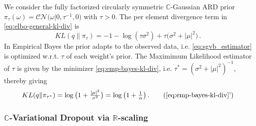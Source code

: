 \documentclass[a4paper,10pt,twocolumn]{article}
\newcommand{\real}{\mathbb{R}}
\newcommand{\cplx}{\mathbb{C}}
\newcommand{\tr}[1]{\mathop{tr}{#1}}
\newcommand{\hop}{{\mkern-1.5mu\dagger}}
\begin{document}
We consider the fully factorized circularly symmetric $\cplx$-Gaussian ARD prior $
  \pi_\tau(\omega)
    = \mathcal{CN}\bigl(
      \omega \vert 0, \tau^{-1}, 0
    \bigr)
$ with $\tau > 0$. The per element divergence term in \eqref{eq:elbo-general-kl-div} is
\begin{equation}  \label{eq:emp-bayes-kl-div}
  KL(q \| \pi_\tau)
    = - 1 - \log{(\tau \sigma^2)}
      + \tau \bigl(
        \sigma^2 + \lvert \mu \rvert^2
      \bigr)
    \,.
\end{equation}
%
%
In Empirical Bayes the prior adapts to the observed data, i.e. \eqref{eq:sgvb_estimator}
is optimized w.r.t. $\tau$ of each weight's prior. The Maximimum Likelihood estimator
of $\tau$ is given by the minimizer \eqref{eq:emp-bayes-kl-div}, i.e. $
  \tau^\ast = (\sigma^2 + \lvert \mu \rvert^2)^{-1}
$, thereby giving
\begin{equation}  \label{eq:emp-bayes-opt-kl}
  KL(q \| \pi_{\tau^\ast})
    = \log{\bigl(1 + \tfrac{\lvert \mu \rvert^2}{\sigma^2}\bigr)}
    = \log{\bigl(1 + \tfrac1\alpha \bigr)}
    \,.
    \tag{\ref{eq:emp-bayes-kl-div}'}
\end{equation}


\subsubsection{$\cplx$-Variational Dropout via $\real$-scaling} %
\label{ssub:real_scaling_dropout}
\end{document}
